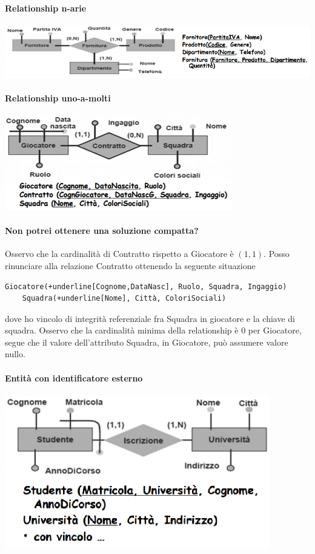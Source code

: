 \paragraph{Relationship n-arie}
\begin{center}
	\includegraphics{images/124.PNG}
\end{center}
\pagebreak
\paragraph{Relationship uno-a-molti}
\begin{center}
	\includegraphics{images/125.PNG}
\end{center}
\paragraph{Non potrei ottenere una soluzione compatta?} Osservo che la cardinalità di Contratto rispetto a Giocatore è $(1,1)$. Posso rinunciare alla relazione Contratto ottenendo la seguente situazione
\begin{Verbatim}[commandchars=+\[\]]
	Giocatore(+underline[Cognome,DataNasc], Ruolo, Squadra, Ingaggio)
	Squadra(+underline[Nome], Città, ColoriSociali)
\end{Verbatim}
dove ho vincolo di integrità referenziale fra Squadra in giocatore e la chiave di squadra. Osservo che la cardinalità minima della relationship è 0 per Giocatore, segue che il valore dell'attributo Squadra, in Giocatore, può assumere valore nullo.
\paragraph{Entità con identificatore esterno}
\begin{center}
	\includegraphics{images/126.PNG}
\end{center}
